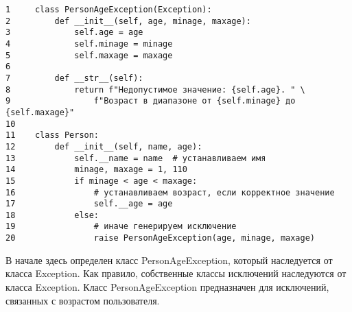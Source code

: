 \documentclass[12pt, a4paper]{article}
\begin{document}
\begin{verbatim}
1     class PersonAgeException(Exception):
2         def __init__(self, age, minage, maxage):
3             self.age = age
4             self.minage = minage
5             self.maxage = maxage
6     
7         def __str__(self):
8             return f"Недопустимое значение: {self.age}. " \
9                 f"Возраст в диапазоне от {self.minage} до {self.maxage}"
10 
11    class Person:
12        def __init__(self, name, age):
13            self.__name = name  # устанавливаем имя
14            minage, maxage = 1, 110
15            if minage < age < maxage:   
16                # устанавливаем возраст, если корректное значение
17                self.__age = age
18            else:                       
19                # иначе генерируем исключение
20                raise PersonAgeException(age, minage, maxage)
\end{verbatim}

В начале здесь определен класс PersonAgeException, который наследуется от класса Exception. Как правило, собственные классы исключений наследуются от класса Exception. Класс PersonAgeException предназначен для исключений, связанных с возрастом пользователя.
\end{document}
